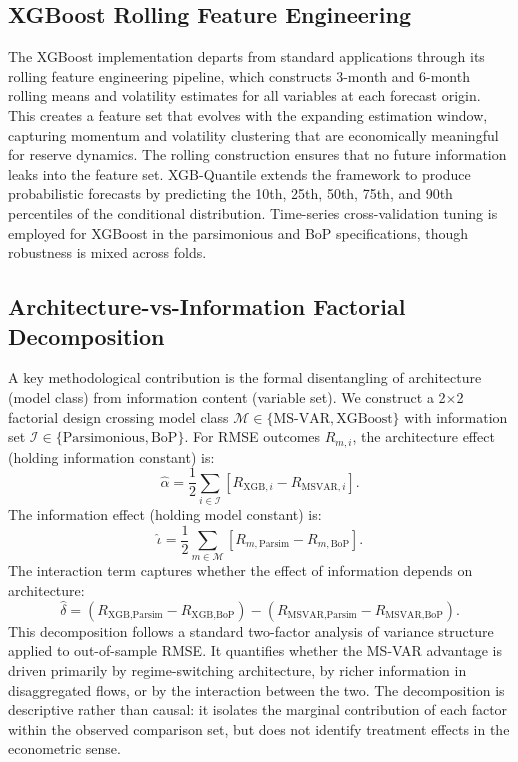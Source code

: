 \documentclass[12pt,a4paper]{article}
\begin{document}
\subsection{XGBoost Rolling Feature Engineering}

The XGBoost implementation departs from standard applications through its rolling feature engineering pipeline, which constructs 3-month and 6-month rolling means and volatility estimates for all variables at each forecast origin. This creates a feature set that evolves with the expanding estimation window, capturing momentum and volatility clustering that are economically meaningful for reserve dynamics. The rolling construction ensures that no future information leaks into the feature set. XGB-Quantile extends the framework to produce probabilistic forecasts by predicting the 10th, 25th, 50th, 75th, and 90th percentiles of the conditional distribution. Time-series cross-validation tuning is employed for XGBoost in the parsimonious and BoP specifications, though robustness is mixed across folds.

\subsection{Architecture-vs-Information Factorial Decomposition}

A key methodological contribution is the formal disentangling of architecture (model class) from information content (variable set). We construct a 2$\times$2 factorial design crossing model class $\mathcal{M} \in \{\text{MS-VAR}, \text{XGBoost}\}$ with information set $\mathcal{I} \in \{\text{Parsimonious}, \text{BoP}\}$. For RMSE outcomes $R_{m,i}$, the architecture effect (holding information constant) is:
\[
\hat{\alpha} = \frac{1}{2}\sum_{i \in \mathcal{I}} \left[ R_{\text{XGB},i} - R_{\text{MSVAR},i} \right].
\]
The information effect (holding model constant) is:
\[
\hat{\iota} = \frac{1}{2}\sum_{m \in \mathcal{M}} \left[ R_{m,\text{Parsim}} - R_{m,\text{BoP}} \right].
\]
The interaction term captures whether the effect of information depends on architecture:
\[
\hat{\delta} = \left(R_{\text{XGB,Parsim}} - R_{\text{XGB,BoP}}\right) - \left(R_{\text{MSVAR,Parsim}} - R_{\text{MSVAR,BoP}}\right).
\]
This decomposition follows a standard two-factor analysis of variance structure applied to out-of-sample RMSE. It quantifies whether the MS-VAR advantage is driven primarily by regime-switching architecture, by richer information in disaggregated flows, or by the interaction between the two. The decomposition is descriptive rather than causal: it isolates the marginal contribution of each factor within the observed comparison set, but does not identify treatment effects in the econometric sense.
\end{document}
